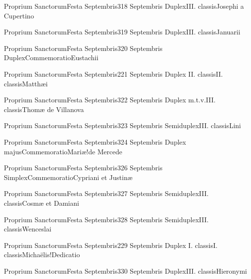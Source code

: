\documentclass[psalterium-feriale.tex]{subfiles}
\begin{document}
	{Proprium Sanctorum}{Festa Septembris}{3}{18 Septembris}
	{Duplex}{III. classis}{Josephi a Cupertino}
	{}
	{}

	{Proprium Sanctorum}{Festa Septembris}{3}{19 Septembris}
	{Duplex}{III. classis}{Januarii}
	{}
	{}

	{Proprium Sanctorum}{Festa Septembris}{3}{20 Septembris}
	{Duplex}{Commemoratio}{Eustachii}
	{}
	{}

	{Proprium Sanctorum}{Festa Septembris}{2}{21 Septembris}
	{Duplex II. classis}{II. classis}{Matthæi}
	{}
	{}
\psalmodiapropria

	{Proprium Sanctorum}{Festa Septembris}{3}{22 Septembris}
	{Duplex m.t.v.}{III. classis}{Thomæ de Villanova}
	{}
	{}

	{Proprium Sanctorum}{Festa Septembris}{3}{23 Septembris}
	{Semiduplex}{III. classis}{Lini}
	{}
	{}

	{Proprium Sanctorum}{Festa Septembris}{3}{24 Septembris}
	{Duplex majus}{Commemoratio}{Mariæ!de Mercede}
	{}
	{}
\psalmodiapropria

	{Proprium Sanctorum}{Festa Septembris}{3}{26 Septembris}
	{Simplex}{Commemoratio}{Cypriani et Justinæ}
	{}
	{}

	{Proprium Sanctorum}{Festa Septembris}{3}{27 Septembris}
	{Semiduplex}{III. classis}{Cosmæ et Damiani}
	{}
	{}

	{Proprium Sanctorum}{Festa Septembris}{3}{28 Septembris}
	{Semiduplex}{III. classis}{Wenceslai}
	{}
	{}

	{Proprium Sanctorum}{Festa Septembris}{2}{29 Septembris}
	{Duplex I. classis}{I. classis}{Michaëlis!Dedicatio}
	{}
	{}
\psalmodiapropria

	{Proprium Sanctorum}{Festa Septembris}{3}{30 Septembris}
	{Duplex}{III. classis}{Hieronymi}
	{}
	{}
\end{document}
